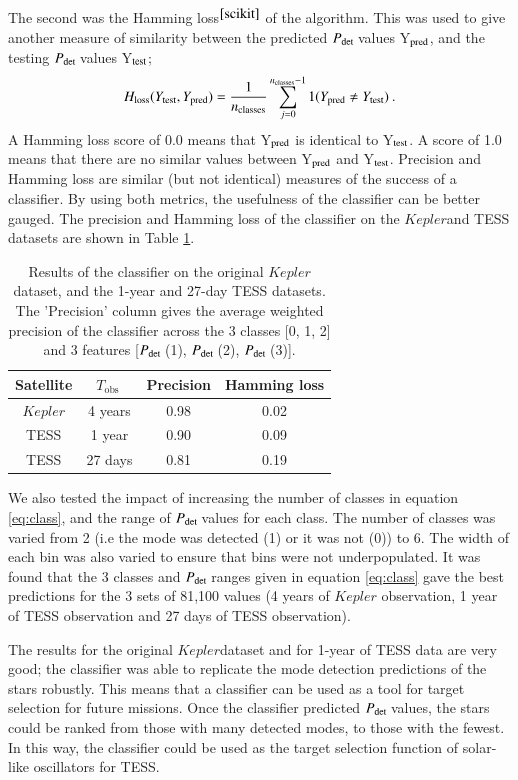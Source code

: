 \documentclass[a4paper,fleqn,usenatbib,useAMS]{mnras}
\newcommand{\kep}{\ensuremath{Kepler}\:}
\newcommand{\pdet}{\ensuremath{P_{\rm det}\:}}
\newcommand{\tobs}{\ensuremath{T_{\textrm{obs}}\:}}
\begin{document}
The second was the Hamming loss$^{\ref{scikit}}$
\citep{wegner_technique_1960} of the algorithm. This was used to give another measure of similarity between the predicted \pdet values Y$_{\rm pred}$, and the testing \pdet values Y$_{\rm test}$;
\begin{equation}
H_{\rm loss}(Y_{\rm test}, Y_{\rm pred}) = \frac{1}{n_{\rm classes}} \sum_{j=0}^{n_{\rm classes}-1} 1(Y_{\rm pred} \neq Y_{\rm test}) \: . 
\end{equation}
A Hamming loss score of 0.0 means that Y$_{\rm pred}$ is identical to Y$_{\rm test}$. A score of 1.0 means that there are no similar values between Y$_{\rm pred}$ and Y$_{\rm test}$. Precision and Hamming loss are similar (but not identical) measures of the success of a classifier. By using both metrics, the usefulness of the classifier can be better gauged. The precision and Hamming loss of the classifier on the \kep and TESS datasets are shown in Table \ref{tab: results}.
\begin{table}
\begin{center}
\begin{tabular}{ |c|c|c|c| }
Satellite & \tobs   & Precision & Hamming loss \\
\hline
\kep      & 4 years & 0.98      & 0.02         \\
TESS      & 1 year  & 0.90      & 0.09         \\
TESS      & 27 days & 0.81      & 0.19         \\
\end{tabular}
\end{center}
\caption{Results of the classifier on the original \kep dataset, and the 1-year and 27-day TESS datasets. The 'Precision' column gives the average weighted precision of the classifier across the 3 classes [0, 1, 2] and 3 features [\pdet(1), \pdet(2), \pdet(3)].}
\label{tab: results}
\end{table}

We also tested the impact of increasing the number of classes in equation \ref{eq:class}, and the range of \pdet values for each class. The number of classes was varied from 2 (i.e the mode was detected (1) or it was not (0)) to 6. The width of each bin was also varied to ensure that bins were not underpopulated. It was found that the 3 classes and \pdet ranges given in equation \ref{eq:class} gave the best predictions for the 3 sets of 81,100 values (4 years of $Kepler$ observation, 1 year of TESS observation and 27 days of TESS observation). 

The results for the original \kep dataset and for 1-year of TESS data are very good; the classifier was able to replicate the mode detection predictions of the stars robustly. This means that a classifier can be used as a tool for target selection for future missions. Once the classifier predicted \pdet values, the stars could be ranked from those with many detected modes, to those with the fewest. In this way, the classifier could be used as the target selection function of solar-like oscillators for TESS. 
\end{document}
